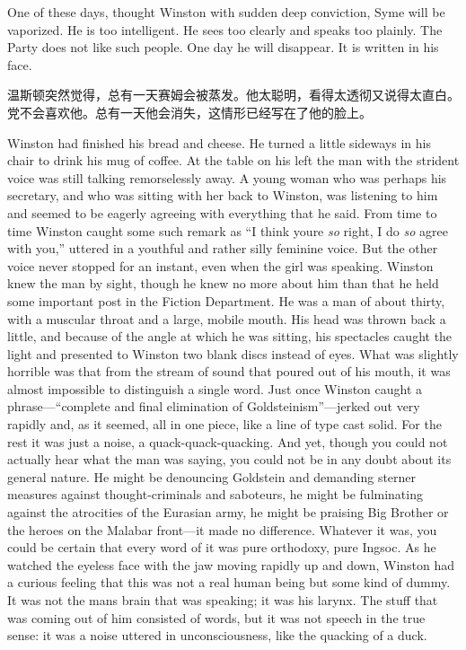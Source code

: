 \begin{paracol}{2}
\switchcolumn*

One of these days, thought Winston with sudden deep conviction, Syme
will be vaporized. He is too intelligent. He sees too clearly and speaks
too plainly. The Party does not like such people. One day he will
disappear. It is written in his face.

\switchcolumn

温斯顿突然觉得，总有一天赛姆会被蒸发。他太聪明，看得太透彻又说得太直白。党不会喜欢他。总有一天他会消失，这情形已经写在了他的脸上。

\switchcolumn*

Winston had finished his bread and cheese. He turned a little sideways
in his chair to drink his mug of coffee. At the table on his left the
man with the strident voice was still talking remorselessly away. A
young woman who was perhaps his secretary, and who was sitting with her
back to Winston, was listening to him and seemed to be eagerly agreeing
with everything that he said. From time to time Winston caught some such
remark as ``I think you\textquotesingle re \emph{so} right, I do
\emph{so} agree with you,'' uttered in a youthful and rather silly
feminine voice. But the other voice never stopped for an instant, even
when the girl was speaking. Winston knew the man by sight, though he
knew no more about him than that he held some important post in the
Fiction Department. He was a man of about thirty, with a muscular throat
and a large, mobile mouth. His head was thrown back a little, and
because of the angle at which he was sitting, his spectacles caught the
light and presented to Winston two blank discs instead of eyes. What was
slightly horrible was that from the stream of sound that poured out of
his mouth, it was almost impossible to distinguish a single word. Just
once Winston caught a phrase---``complete and final elimination of
Goldsteinism''---jerked out very rapidly and, as it seemed, all in one
piece, like a line of type cast solid. For the rest it was just a noise,
a quack-quack-quacking. And yet, though you could not actually hear what
the man was saying, you could not be in any doubt about its general
nature. He might be denouncing Goldstein and demanding sterner measures
against thought-criminals and saboteurs, he might be fulminating against
the atrocities of the Eurasian army, he might be praising Big Brother or
the heroes on the Malabar front---it made no difference. Whatever it
was, you could be certain that every word of it was pure orthodoxy, pure
Ingsoc. As he watched the eyeless face with the jaw moving rapidly up
and down, Winston had a curious feeling that this was not a real human
being but some kind of dummy. It was not the man\textquotesingle s brain
that was speaking; it was his larynx. The stuff that was coming out of
him consisted of words, but it was not speech in the true sense: it was
a noise uttered in unconsciousness, like the quacking of a duck.


\end{paracol}
